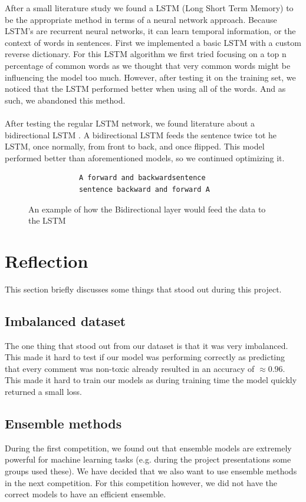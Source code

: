 \documentclass[10pt, a4paper]{article}
\begin{document}
\begin{multicols}{2}
		After a small literature study we found a LSTM (Long Short Term Memory) to be the appropriate method in terms of a neural network approach. Because LSTM's are recurrent neural networks, it can learn temporal information, or the context of words in sentences. First we implemented a basic LSTM with a custom reverse dictionary. For this LSTM algorithm we first tried focusing on a top n percentage of common words as we thought that very common words might be influencing the model too much. However, after testing it on the training set, we noticed that the LSTM performed better when using all of the words. And as such, we abandoned this method.
		\\
		\\
		After testing the regular LSTM network, we found literature about a bidirectional LSTM \cite{zhou2016text}. A bidirectional LSTM feeds the sentence twice tot he LSTM, once normally, from front to back, and once flipped. This model performed better than aforementioned models, so we continued optimizing it.
		
		\begin{figure}
			\begin{verbatim}	
			A forward and backwardsentence
			sentence backward and forward A
			\end{verbatim}
			\caption{An example of how the  Bidirectional layer would feed the data to the LSTM}
		\end{figure}
		\newpage
		\begin{minipage}{\linewidth}
		\section{Reflection}
		This section briefly discusses some things that stood out during this project.
		\subsection{Imbalanced dataset}
		The one thing that stood out from our dataset is that it was very imbalanced. This made it hard to test if our model was performing correctly as predicting that every comment was non-toxic already resulted in an accuracy of $\approx 0.96$. This made it hard to train our models as during training time the model quickly returned a small loss.
    	\subsection{Ensemble methods}
		During the first competition, we found out that ensemble models are extremely powerful for machine learning tasks (e.g. during the project presentations some groups used these). We have decided that we also want to use ensemble methods in the next competition. For this competition however, we did not have the correct models to have an efficient ensemble.

\end{minipage}
\end{multicols}
\end{document}
